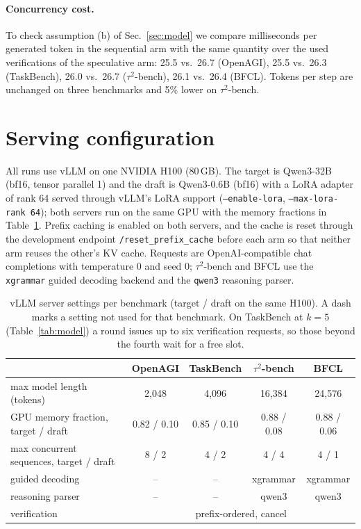 \paragraph{Concurrency cost.}
To check assumption (b) of Sec.~\ref{sec:model} we compare milliseconds per
generated token in the sequential arm with the same quantity over the used
verifications of the speculative arm: 25.5 vs.\ 26.7 (OpenAGI), 25.5 vs.\ 26.3
(TaskBench), 26.0 vs.\ 26.7 ($\tau^2$-bench), 26.1 vs.\ 26.4 (BFCL). Tokens per step
are unchanged on three benchmarks and 5\% lower on $\tau^2$-bench.

\section{Serving configuration}
\label{app:serving}

All runs use vLLM on one NVIDIA H100 (80\,GB). The target is
Qwen3-32B (bf16, tensor parallel 1) and the draft is Qwen3-0.6B (bf16) with a
LoRA adapter of rank 64
served through vLLM's LoRA support (\texttt{--enable-lora},
\texttt{--max-lora-rank 64}); both servers run on the same GPU with the memory
fractions in Table~\ref{tab:serving}. Prefix caching is enabled on both
servers, and the cache is reset through the development endpoint
\texttt{/reset\_prefix\_cache} before each arm so that neither arm reuses the
other's KV cache. Requests are OpenAI-compatible chat completions with
temperature 0 and seed 0; $\tau^2$-bench and BFCL use the \texttt{xgrammar} guided
decoding backend and the \texttt{qwen3} reasoning parser.

\begin{table}[h]
\centering
\small
\caption{vLLM server settings per benchmark (target / draft on the same H100). A dash marks a setting
not used for that benchmark. On TaskBench at $k{=}5$ (Table~\ref{tab:model}) a round issues up to six
verification requests, so those beyond the fourth wait for a free slot.}
\label{tab:serving}
\begin{tabular}{lcccc}
\toprule
 & OpenAGI & TaskBench & $\tau^2$-bench & BFCL \\
\midrule
max model length (tokens) & 2{,}048 & 4{,}096 & 16{,}384 & 24{,}576 \\
GPU memory fraction, target / draft & 0.82 / 0.10 & 0.85 / 0.10 & 0.88 / 0.08 & 0.88 / 0.06 \\
max concurrent sequences, target / draft & 8 / 2 & 4 / 2 & 4 / 4 & 4 / 1 \\
guided decoding & -- & -- & xgrammar & xgrammar \\
reasoning parser & -- & -- & qwen3 & qwen3 \\
verification & \multicolumn{4}{c}{prefix-ordered, cancel} \\
\bottomrule
\end{tabular}
\end{table}

